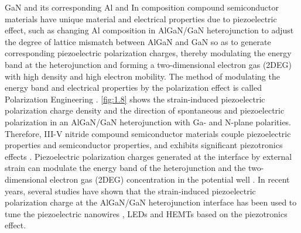 GaN and its corresponding Al and In composition compound semiconductor materials have unique material and electrical properties due to  piezoelectric effect, such as changing Al composition in AlGaN/GaN heterojunction to adjust the degree of lattice mismatch  between AlGaN and GaN so as to generate corresponding  piezoelectric polarization charges, thereby modulating  the energy band  at the heterojunction and forming a two-dimensional electron gas (2DEG)  with high density and high  electron mobility. The method of modulating the energy band  and electrical properties by the polarization effect  is called Polarization Engineering  \cite{hao2016nitride,jena2010polarization}. \autoref{fig:1.8} shows the strain-induced  piezoelectric polarization charge  density and the direction of spontaneous  and piezoelectric polarization  in an AlGaN/GaN heterojunction with Ga- and N-plane polarities. Therefore, III-V nitride  compound semiconductor materials couple piezoelectric properties and semiconductor properties, and exhibits significant piezotronics  effects \cite{pan2019piezotronics,sha2019iii,wang2018piezotronics}. Piezoelectric polarization charges generated at the interface by external strain can modulate the energy band of the heterojunction and the two-dimensional electron gas (2DEG) concentration  in the potential  well \cite{lev2018k}. In recent years, several studies have shown that the  strain-induced piezoelectric polarization charge at the AlGaN/GaN heterojunction interface  has been used to tune the piezoelectric nanowires \cite{wang2016piezotronic}, LEDs \cite{huang2016piezo,liu2020piezo,guo2021enhanced} and HEMTs \cite{liu2017electrical,jiang2017piezotronic,zhu2019piezotronic} based on the piezotronics effect.

